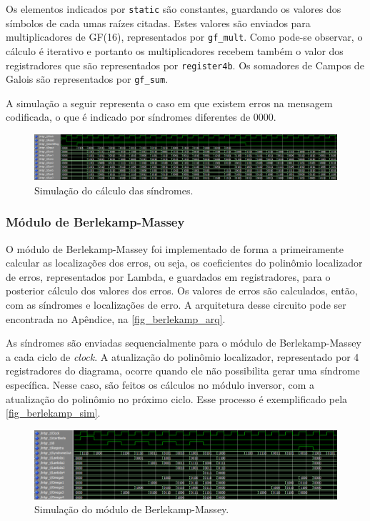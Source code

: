 	Os elementos indicados por \texttt{static} são constantes, guardando os valores dos símbolos de cada umas raízes citadas. Estes valores são enviados para multiplicadores de GF(16), representados por \texttt{gf\_mult}. Como pode-se observar, o cálculo é iterativo e portanto os multiplicadores recebem também o valor dos registradores que são representados por \texttt{register4b}. Os somadores de Campos de Galois são representados por \texttt{gf\_sum}.

	A simulação a seguir representa o caso em que existem erros na mensagem codificada, o que é indicado por síndromes diferentes de 0000.

	\begin{figure}[h]
		\caption{\label{fig_sindrome_sim}Simulação do cálculo das síndromes.}
		\centering
		\includegraphics[width=1\textwidth]{RS/Sim_sindrome.PNG}
		\legend{}
	\end{figure}

	\subsubsection{Módulo de Berlekamp-Massey}

	O módulo de Berlekamp-Massey foi implementado de forma a primeiramente calcular as localizações dos erros, ou seja, os coeficientes do polinômio localizador de erros, representados por Lambda, e guardados em registradores, para o posterior cálculo dos valores dos erros. Os valores de erros são calculados, então, com as síndromes e localizações de erro. A arquitetura desse circuito pode ser encontrada no Apêndice, na \autoref{fig_berlekamp_arq}.

	As síndromes são enviadas sequencialmente para o módulo de Berlekamp-Massey a cada ciclo de \textit{clock}. A atualização do polinômio localizador, representado por 4 registradores do diagrama, ocorre quando ele não possibilita gerar uma síndrome específica. Nesse caso, são feitos os cálculos no módulo inversor, com a atualização do polinômio no próximo ciclo. Esse processo é exemplificado pela \autoref{fig_berlekamp_sim}.

	\begin{figure}[!htb]
		\caption{\label{fig_berlekamp_sim}Simulação do módulo de Berlekamp-Massey.}
		\centering
		\includegraphics[width=1\textwidth]{RS/Sim_berlekamp.PNG}
	\end{figure}

